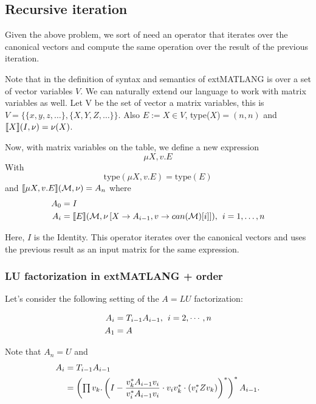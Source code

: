 \subsection{Recursive iteration}

Given the above problem, we sort of need an operator that iterates over the canonical vectors and compute the same operation over the result of the previous iteration.

Note that in the definition of syntax and semantics of extMATLANG is over a set of vector variables $V$. We can naturally extend our language to work with matrix variables as well. Let V be the set of vector a matrix variables, this is $V=\lbrace\lbrace x, y, z, \ldots\rbrace,\lbrace X,Y,Z,\ldots\rbrace\rbrace$. Also $E:=X\in V$, type($X$)$=(n, n)$ and $\llbracket X \rrbracket(I,\nu)=\nu(X)$.

Now, with matrix variables on the table, we define a new expression $$\mu X, v.E$$ With $$\text{type}(\mu X,v. E) = \text{type}(E)$$ and $\llbracket \mu X,v. E \rrbracket(\mathcal{M},\nu) = A_n$ where
\begin{align*}
A_0 &= I \\
A_i &= \llbracket E \rrbracket(\mathcal{M},\nu\left[X\rightarrow A_{i-1}, v\rightarrow can(\mathcal{M})[i]\right]),\hspace{1ex} i= 1, \ldots, n 
\end{align*}

Here, $I$ is the Identity. This operator iterates over the canonical vectors and uses the previous result as an input matrix for the same expression.

\subsubsection{LU factorization in extMATLANG + order}
Let's consider the following setting of the $A=LU$ factorization:

\begin{align*}
A_i&=T_{i-1}A_{i-1},\hspace{1ex}i=2, \cdots, n \\
A_1&=A \\
\end{align*}

Note that $A_n=U$ and 
\begin{align*}
A_i&=T_{i-1}A_{i-1} \\
&=\left(\textstyle\prod v_k.\left(I-\dfrac{v_k^*A_{i-1}v_i}{v_i^*A_{i-1}v_i}\cdot v_iv_k^*\cdot\left(v_i^*Zv_k\right)\right)^*\right)^*A_{i-1}.
\end{align*}


